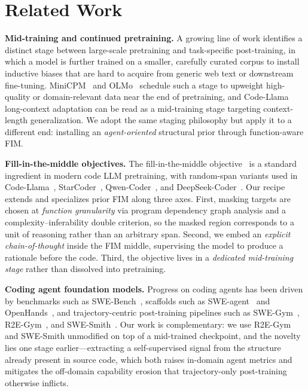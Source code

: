 \section{Related Work}
\vspace{-0.5ex}
\label{sec:related}

\textbf{Mid-training and continued pretraining.}
A growing line of work identifies a distinct stage between large-scale
pretraining and task-specific post-training, in which a model is further
trained on a smaller, carefully curated corpus to install inductive biases
that are hard to acquire from generic web text or downstream fine-tuning.
MiniCPM~\citep{minicpm} and OLMo~\citep{olmo} schedule such a stage to
upweight high-quality or domain-relevant data near the end of pretraining,
and Code-Llama~\citep{codellama} long-context adaptation can be read as a
mid-training stage targeting context-length generalization. We adopt the
same staging philosophy but apply it to a different end: installing an
\textit{agent-oriented} structural prior through function-aware FIM.

\textbf{Fill-in-the-middle objectives.}
The fill-in-the-middle objective~\citep{bavarian2022fim} is a standard
ingredient in modern code LLM pretraining, with random-span variants used
in Code-Llama~\citep{codellama}, StarCoder~\citep{starcoder},
Qwen-Coder~\citep{qwencoder}, and DeepSeek-Coder~\citep{deepseekcoder}.
Our recipe extends and specializes prior FIM along three axes. First,
masking targets are chosen at \textit{function granularity} via program
dependency graph analysis and a complexity--inferability double criterion,
so the masked region corresponds to a unit of reasoning rather than an
arbitrary span. Second, we embed an \textit{explicit chain-of-thought}
inside the FIM middle, supervising the model to produce a rationale
before the code. Third, the objective lives in a \textit{dedicated
mid-training stage} rather than dissolved into pretraining.

\textbf{Coding agent foundation models.}
Progress on coding agents has been driven by benchmarks such as
SWE-Bench~\citep{swebench}, scaffolds such as SWE-agent~\citep{sweagent}
and OpenHands~\citep{openhands}, and trajectory-centric post-training
pipelines such as SWE-Gym~\citep{swegym}, R2E-Gym~\citep{r2egym}, and
SWE-Smith~\citep{swesmith}. Our work is complementary: we use R2E-Gym and
SWE-Smith unmodified on top of a mid-trained checkpoint, and the novelty
lies one stage earlier---extracting a self-supervised signal from the
structure already present in source code, which both raises in-domain
agent metrics and mitigates the off-domain capability erosion that
trajectory-only post-training otherwise inflicts.

